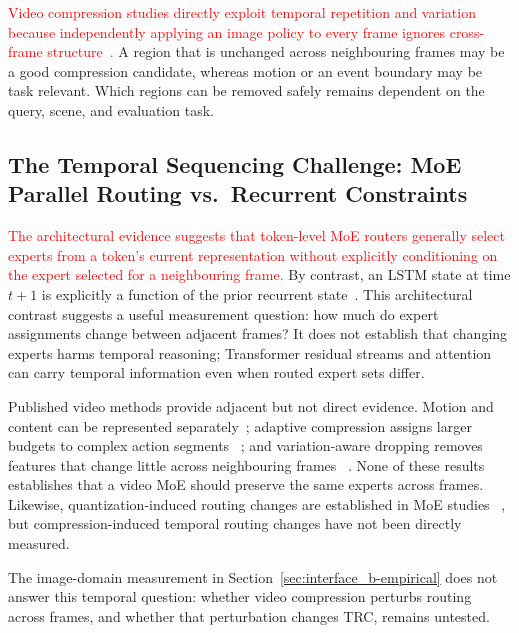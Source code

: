 \documentclass[10pt]{article}
\begin{document}
\textcolor{red}{Video compression studies directly exploit temporal repetition and
variation because independently applying an image policy to every frame ignores
cross-frame structure~\citep{zhang2025dyntokdynamiccompressionvisual,chen2026variationawarevisiontokendropping}.}
A region that is unchanged across neighbouring frames may be a good compression
candidate, whereas motion or an event boundary may be task relevant.  Which regions can
be removed safely remains dependent on the query, scene, and evaluation task.

\subsection{The Temporal Sequencing Challenge: MoE Parallel Routing vs.\ Recurrent
Constraints}

\textcolor{red}{The architectural evidence suggests that token-level MoE routers
generally select experts from a token's current representation without explicitly
conditioning on the expert selected for a neighbouring frame.}  By contrast, an LSTM state at time $t+1$ is explicitly a
function of the prior recurrent state~\citep{10.1162/neco.1997.9.8.1735}.  This
architectural contrast suggests a useful measurement question: how much do expert
assignments change between adjacent frames?  It does not establish that changing
experts harms temporal reasoning; Transformer residual streams and attention can carry
temporal information even when routed expert sets differ.

Published video methods provide adjacent but not direct evidence.  Motion and content
can be represented separately~\citep{zhang2025vqtokenneuraldiscretetoken}; adaptive
compression assigns larger budgets to complex action segments
~\citep{zhang2025dyntokdynamiccompressionvisual}; and variation-aware dropping removes
features that change little across neighbouring frames
~\citep{chen2026variationawarevisiontokendropping}.  None of these results establishes
that a video MoE should preserve the same experts across frames.  Likewise,
quantization-induced routing changes are established in MoE studies
~\citep{fu2026eaquantenhancingposttrainingquantization}, but compression-induced
temporal routing changes have not been directly measured.

The image-domain measurement in Section~\ref{sec:interface_b-empirical} does not answer
this temporal question: whether video compression perturbs routing across frames, and
whether that perturbation changes TRC, remains untested.
\end{document}
